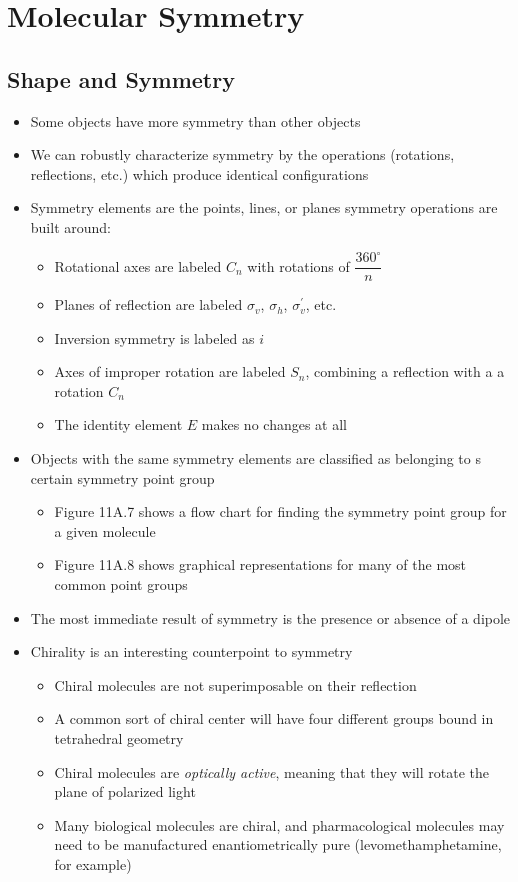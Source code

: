 \documentclass[12pt, openany, letterpaper]{memoir}
\begin{document}
\chapter{Molecular Symmetry}
\section{Shape and Symmetry}
\begin{itemize}
	\item Some objects have more symmetry than other objects
	\item We can robustly characterize symmetry by the operations (rotations, reflections, etc.) which produce identical configurations
	\item Symmetry elements are the points, lines, or planes symmetry operations are built around:
	\begin{itemize}
		\item Rotational axes are labeled $C_n$ with rotations of $\dfrac{360^{\circ}}{n}$
		\item Planes of reflection are labeled $\sigma_v$, $\sigma_h$, $\sigma_v^\prime$, etc.
		\item Inversion symmetry is labeled as $i$
		\item Axes of improper rotation are labeled $S_n$, combining a reflection with a a rotation $C_n$
		\item The identity element $E$ makes no changes at all
	\end{itemize}
	\item Objects with the same symmetry elements are classified as belonging to s certain symmetry point group
	\begin{itemize}
		\item Figure 11A.7 shows a flow chart for finding the symmetry point group for a given molecule
		\item Figure 11A.8 shows graphical representations for many of the most common point groups
	\end{itemize}
	\item The most immediate result of symmetry is the presence or absence of a dipole
	\item Chirality is an interesting counterpoint to symmetry
	\begin{itemize}
		\item Chiral molecules are not superimposable on their reflection
		\item A common sort of chiral center will have four different groups bound in tetrahedral geometry
		\item Chiral molecules are \emph{optically active}, meaning that they will rotate the plane of polarized light
		\item Many biological molecules are chiral, and pharmacological molecules may need to be manufactured enantiometrically pure (levomethamphetamine, for example)
	\end{itemize}
\end{itemize}
\end{document}
